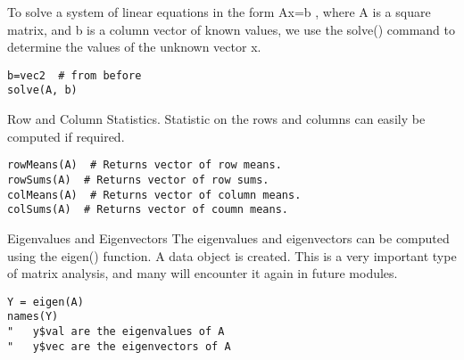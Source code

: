 To solve a system of linear equations in the form Ax=b , where A is a square matrix, and b is a column vector of known values, we use the solve() command to determine the values of the unknown vector x.
\begin{verbatim}
b=vec2  # from before
solve(A, b)
\end{verbatim}
Row and Column Statistics.
Statistic on the rows and columns can easily be computed if required.
\begin{verbatim}
rowMeans(A)  # Returns vector of row means.
rowSums(A)  # Returns vector of row sums.
colMeans(A)  # Returns vector of column means.
colSums(A)  # Returns vector of coumn means.
\end{verbatim}
Eigenvalues and Eigenvectors
The eigenvalues and eigenvectors can be computed using the eigen() function.  A data object is created.
This is a very important type of matrix analysis, and many will encounter it again in future modules.
\begin{verbatim}
Y = eigen(A)
names(Y)
"	y$val are the eigenvalues of A
"	y$vec are the eigenvectors of A
\end{verbatim}
